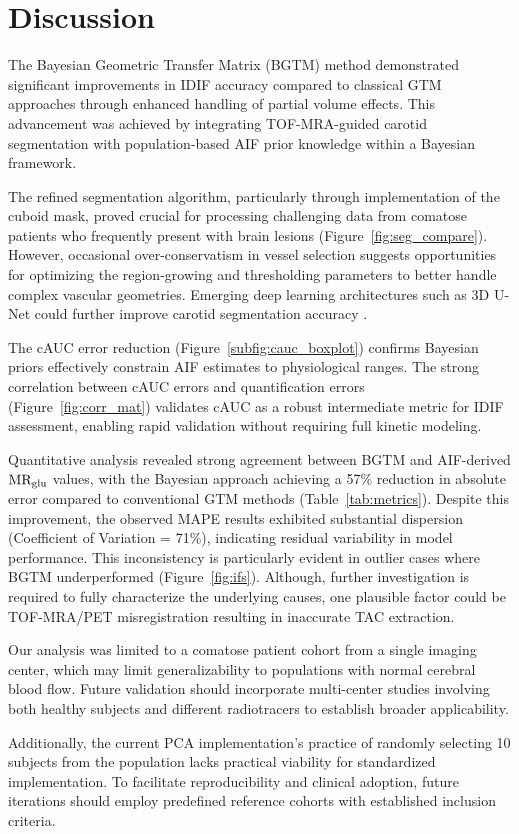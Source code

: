 \chapter{Discussion}
The Bayesian Geometric Transfer Matrix (BGTM) method demonstrated significant improvements in IDIF accuracy compared to classical GTM approaches through enhanced handling of partial volume effects. This advancement was achieved by integrating TOF-MRA-guided carotid segmentation with population-based AIF prior knowledge within a Bayesian framework.

The refined segmentation algorithm, particularly through implementation of the cuboid mask, proved crucial for processing challenging data from comatose patients who frequently present with brain lesions (Figure~\ref{fig:seg_compare}).
However, occasional over-conservatism in vessel selection suggests opportunities for optimizing the region-growing and thresholding parameters to better handle complex vascular geometries.
Emerging deep learning architectures such as 3D U-Net could further improve carotid segmentation accuracy \cite{chavan2024end}.

The cAUC error reduction (Figure~\ref{subfig:cauc_boxplot}) confirms Bayesian priors effectively constrain AIF estimates to physiological ranges.
The strong correlation between cAUC errors and quantification errors (Figure~\ref{fig:corr_mat}) validates cAUC as a robust intermediate metric for IDIF assessment, enabling rapid validation without requiring full kinetic modeling.

Quantitative analysis revealed strong agreement between BGTM and AIF-derived $\text{MR}_{\text{glu}}$ values, with the Bayesian approach achieving a 57\% reduction in absolute error compared to conventional GTM methods (Table~\ref{tab:metrics}).
Despite this improvement, the observed MAPE results exhibited substantial dispersion (Coefficient of Variation = 71\%), indicating residual variability in model performance.
This inconsistency is particularly evident in outlier cases where BGTM underperformed (Figure~\ref{fig:ifs}).
Although, further investigation is required to fully characterize the underlying causes, one plausible factor could be TOF-MRA/PET misregistration resulting in inaccurate TAC extraction.


Our analysis was limited to a comatose patient cohort from a single imaging center, which may limit generalizability to populations with normal cerebral blood flow.
Future validation should incorporate multi-center studies involving both healthy subjects and different radiotracers to establish broader applicability.

Additionally, the current PCA implementation's practice of randomly selecting 10 subjects from the population lacks practical viability for standardized implementation.
To facilitate reproducibility and clinical adoption, future iterations should employ predefined reference cohorts with established inclusion criteria.
